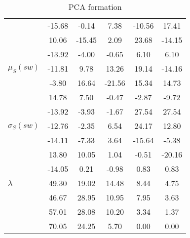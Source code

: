 \begin{table}[h!]
\begin{center}
\begin{tabular}{| l || c | c | c | c | c |}
 & -15.68  & -0.14  & 7.38  & -10.56  & 17.41 \\
 & 10.06  & -15.45  & 2.09  & 23.68  & -14.15 \\
 & -13.92  & -4.00  & -0.65  & 6.10  & 6.10 \\\hline
$\mu_S(sw)$ & -11.81  & 9.78  & 13.26  & 19.14  & -14.16 \\
 & -3.80  & 16.64  & -21.56  & 15.34  & 14.73 \\
 & 14.78  & 7.50  & -0.47  & -2.87  & -9.72 \\
 & -13.92  & -3.93  & -1.67  & 27.54  & 27.54 \\\hline
$\sigma_S(sw)$ & -12.76  & -2.35  & 6.54  & 24.17  & 12.80 \\
 & -14.11  & -7.33  & 3.64  & -15.64  & -5.38 \\
 & 13.80  & 10.05  & 1.04  & -0.51  & -20.16 \\
 & -14.05  & 0.21  & -0.98  & 0.83  & 0.83 \\\hline\hline
$\lambda$ & 49.30  & 19.02  & 14.48  & 8.44  & 4.75 \\
 & 46.67  & 28.95  & 10.95  & 7.95  & 3.63 \\
 & 57.01  & 28.08  & 10.20  & 3.34  & 1.37 \\
 & 70.05  & 24.25  & 5.70  & 0.00  & 0.00 \\\hline
\end{tabular}
\caption{PCA formation}
\end{center}
\end{table}